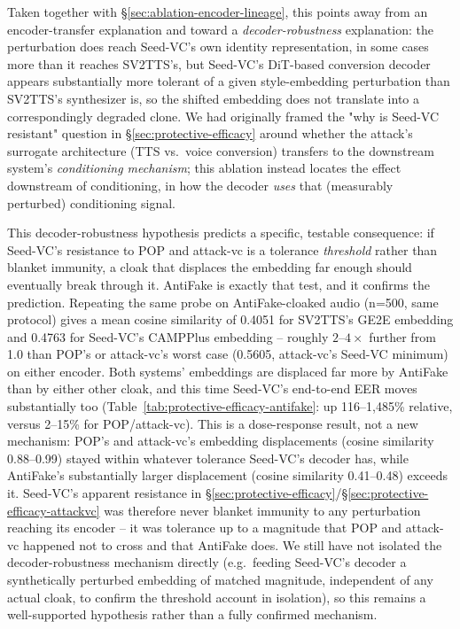 \documentclass[11pt]{article}
\begin{document}
Taken together with \S\ref{sec:ablation-encoder-lineage}, this points
away from an encoder-transfer explanation and toward a
\emph{decoder-robustness} explanation: the perturbation does reach
Seed-VC's own identity representation, in some cases more than it
reaches SV2TTS's, but Seed-VC's DiT-based conversion decoder appears
substantially more tolerant of a given style-embedding perturbation
than SV2TTS's synthesizer is, so the shifted embedding does not
translate into a correspondingly degraded clone. We had originally
framed the "why is Seed-VC resistant" question in
\S\ref{sec:protective-efficacy} around whether the attack's surrogate
architecture (TTS vs.\ voice conversion) transfers to the downstream
system's \emph{conditioning mechanism}; this ablation instead locates
the effect downstream of conditioning, in how the decoder \emph{uses}
that (measurably perturbed) conditioning signal.

This decoder-robustness hypothesis predicts a specific, testable
consequence: if Seed-VC's resistance to POP and attack-vc is a
tolerance \emph{threshold} rather than blanket immunity, a cloak that
displaces the embedding far enough should eventually break through it.
AntiFake is exactly that test, and it confirms the prediction. Repeating
the same probe on AntiFake-cloaked audio (n=500, same protocol) gives a
mean cosine similarity of 0.4051 for SV2TTS's GE2E embedding and 0.4763
for Seed-VC's CAMPPlus embedding -- roughly $2$--$4\times$ further from
1.0 than POP's or attack-vc's worst case (0.5605, attack-vc's Seed-VC
minimum) on either encoder. Both systems' embeddings are displaced far
more by AntiFake than by either other cloak, and this time Seed-VC's
end-to-end EER moves substantially too
(Table~\ref{tab:protective-efficacy-antifake}: up 116--1{,}485\%
relative, versus 2--15\% for POP/attack-vc). This is a dose-response
result, not a new mechanism: POP's and attack-vc's embedding
displacements (cosine similarity 0.88--0.99) stayed within whatever
tolerance Seed-VC's decoder has, while AntiFake's substantially larger
displacement (cosine similarity 0.41--0.48) exceeds it. Seed-VC's
apparent resistance in \S\ref{sec:protective-efficacy}/\S\ref{sec:protective-efficacy-attackvc}
was therefore never blanket immunity to any perturbation reaching its
encoder -- it was tolerance up to a magnitude that POP and attack-vc
happened not to cross and that AntiFake does. We still have not
isolated the decoder-robustness mechanism directly (e.g.\ feeding
Seed-VC's decoder a synthetically perturbed embedding of matched
magnitude, independent of any actual cloak, to confirm the threshold
account in isolation), so this remains a well-supported hypothesis
rather than a fully confirmed mechanism.
\end{document}
